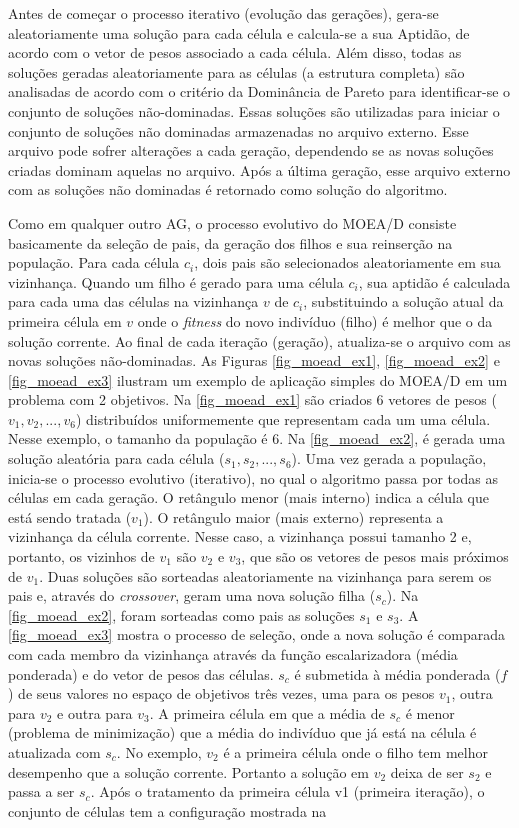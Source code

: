 Antes de começar o processo iterativo (evolução das gerações), gera-se aleatoriamente uma solução para cada célula e calcula-se a sua
Aptidão, de acordo com o vetor de pesos associado a cada célula. Além disso, todas as soluções geradas aleatoriamente para as células (a estrutura completa) são analisadas de acordo com o critério da Dominância de Pareto para identificar-se o conjunto de soluções não-dominadas. Essas soluções são utilizadas para iniciar o conjunto de soluções não dominadas armazenadas no arquivo externo. Esse arquivo pode sofrer alterações a cada geração, dependendo se as novas soluções criadas dominam aquelas no arquivo. Após a última geração, esse arquivo externo com as soluções não dominadas é retornado como solução do algoritmo.

Como em qualquer outro AG, o processo evolutivo do MOEA/D consiste basicamente da seleção de pais, da geração dos filhos e sua reinserção na população. Para cada célula $c_i$, dois pais são selecionados aleatoriamente em sua vizinhança. Quando um filho é gerado para uma célula $c_i$, sua aptidão é calculada para cada uma das células na vizinhança $v$ de $c_i$, substituindo a solução atual da primeira célula em $v$ onde o \textit{fitness} do novo indivíduo (filho) é melhor que o da solução corrente. Ao final de cada iteração (geração), atualiza-se o arquivo com as novas soluções não-dominadas. As Figuras \ref{fig_moead_ex1}, \ref{fig_moead_ex2} e \ref{fig_moead_ex3} ilustram um exemplo de aplicação simples do MOEA/D em um problema com 2 objetivos. Na \autoref{fig_moead_ex1} são criados 6 vetores de pesos ($v_1, v_2, ..., v_6$) distribuídos uniformemente que representam cada um uma célula. Nesse exemplo, o tamanho da população é 6. Na \autoref{fig_moead_ex2}, é gerada uma solução aleatória para cada célula ($s_1, s_2, ..., s_6$). Uma vez gerada a população, inicia-se o processo evolutivo (iterativo), no qual o algoritmo passa por todas as células em cada geração. O retângulo menor (mais interno) indica a célula que está sendo tratada ($v_1$). O retângulo maior (mais externo) representa a vizinhança da célula corrente. Nesse caso, a vizinhança possui tamanho 2 e, portanto, os vizinhos de $v_1$ são $v_2$ e $v_3$, que são os vetores de pesos mais próximos de $v_1$. Duas soluções são sorteadas aleatoriamente na vizinhança para serem os pais e, através do \textit{crossover}, geram uma nova solução filha ($s_c$). Na \autoref{fig_moead_ex2}, foram sorteadas como pais as soluções $s_1$ e $s_3$. A \autoref{fig_moead_ex3} mostra o processo de seleção, onde a nova solução é comparada com cada membro da vizinhança através da função escalarizadora (média ponderada) e do vetor de pesos das células. $s_c$ é submetida à média ponderada ($f$) de seus valores no espaço de objetivos três vezes, uma para os pesos $v_1$, outra para $v_2$ e outra para $v_3$. A primeira célula em que a média de $s_c$ é menor (problema de minimização) que a média do indivíduo que já está na célula é atualizada com $s_c$. No exemplo, $v_2$ é a primeira célula onde o filho tem melhor desempenho que a solução corrente. Portanto a solução em $v_2$ deixa de ser $s_2$ e passa a ser $s_c$. Após o tratamento da primeira célula v1 (primeira iteração), o conjunto de células tem a configuração mostrada na  